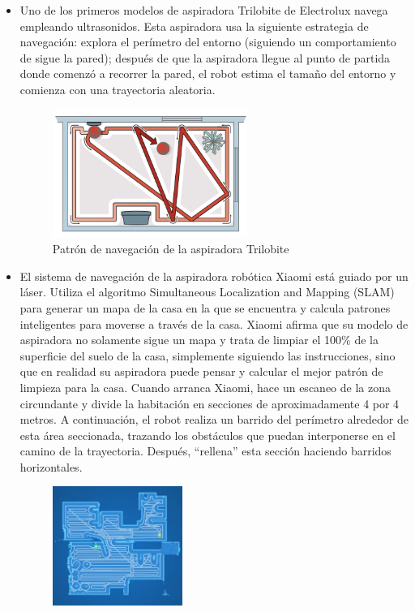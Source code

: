 \begin{itemize}
\item Uno de los primeros modelos de aspiradora Trilobite de Electrolux navega empleando ultrasonidos. Esta aspiradora usa la siguiente estrategia de navegación: explora el perímetro del entorno (siguiendo un comportamiento de sigue la pared); después de que la aspiradora llegue al punto de partida donde comenzó a recorrer la pared, el robot estima el tamaño del entorno y comienza con una trayectoria aleatoria.\\
\begin{figure}[H]
  \begin{center}
    \includegraphics[width=0.6\textwidth]{figures/Vacuum/Trilobite.png}
		\caption{Patrón de navegación de la aspiradora Trilobite}
		\label{fig.Trilobite}
		\end{center}
\end{figure}
\item El sistema de navegación de la aspiradora robótica Xiaomi está guiado por un láser. Utiliza el algoritmo Simultaneous Localization and Mapping (SLAM) para generar un mapa de la casa en la que se encuentra y calcula patrones inteligentes para moverse a través de la casa. Xiaomi afirma que su modelo de aspiradora no solamente sigue un mapa y trata de limpiar el 100\% de la superficie del suelo de la casa, simplemente siguiendo las instrucciones, sino que en realidad su aspiradora puede pensar y calcular el mejor patrón de limpieza para la casa.  Cuando arranca Xiaomi, hace un escaneo de la zona circundante y divide la habitación en secciones de aproximadamente 4 por 4 metros. A continuación, el robot realiza un barrido del perímetro alrededor de esta área seccionada, trazando los obstáculos que puedan interponerse en el camino de la trayectoria. Después, ``rellena'' esta sección haciendo barridos horizontales.\\
\begin{figure}[H]
  \begin{center}
    \includegraphics[width=0.4\textwidth]{figures/Vacuum/Xiaomi.png}

\end{center}
\end{figure}
\end{itemize}

